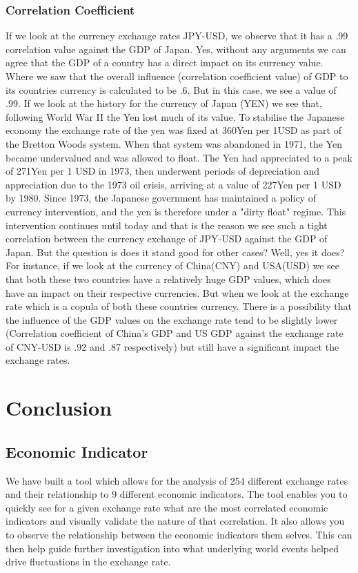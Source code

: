 \subsubsection{Correlation Coefficient}
If we look at the currency exchange rates JPY-USD, we observe that it has a .99 correlation value against the GDP of Japan. Yes, without any arguments we can agree that the GDP of a country has a direct impact on its currency value. Where we saw that the overall influence (correlation coefficient value) of GDP to its countries currency is calculated to be .6. But in this case, we see a value of .99.
\newline
If we look at the history for the currency of Japan (YEN) we see that, following World War II the Yen lost much of its value. To stabilise the Japanese economy the exchange rate of the yen was fixed at 360Yen per 1USD as part of the Bretton Woods system. When that system was abandoned in 1971, the Yen became undervalued and was allowed to float. The Yen had appreciated to a peak of 271Yen per 1 USD in 1973, then underwent periods of depreciation and appreciation due to the 1973 oil crisis, arriving at a value of 227Yen per 1 USD by 1980. Since 1973, the Japanese government has maintained a policy of currency intervention, and the yen is therefore under a "dirty float" regime. This intervention continues until today and that is the reason we see such a tight correlation between the currency exchange of JPY-USD against the GDP of Japan.\newline
But the question is does it stand good for other cases? Well, yes it does? For instance, if we look at the currency of China(CNY) and USA(USD) we see that both these two countries have a relatively huge GDP values, which does have an impact on their respective currencies. But when we look at the exchange rate which is a copula of both these countries currency. There is a possibility that the influence of the GDP values on the exchange rate tend to be slightly lower (Correlation coefficient of China's GDP and US GDP against the exchange rate of CNY-USD is .92 and .87 respectively) but still have a significant impact the exchange rates. 

\section{Conclusion}
\subsection{Economic Indicator}
We have built a tool which allows for the analysis of 254 different exchange rates and their relationship to 9 different economic indicators.  The tool enables you to quickly see for a given exchange rate what are the most correlated economic indicators and visually validate the nature of that correlation.  It also allows you to observe the relationship between the economic indicators them selves.  This can then help guide further investigation into what underlying world events helped drive fluctuations in the exchange rate.

